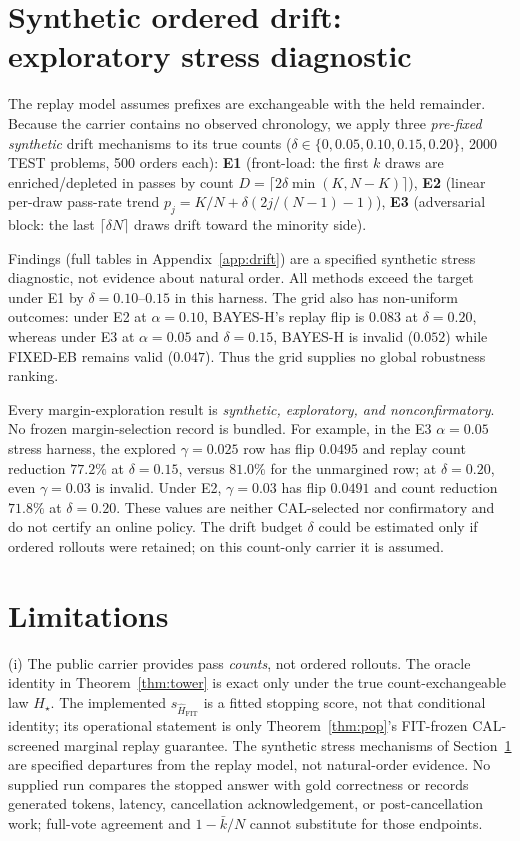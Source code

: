 \documentclass{article}
\theoremstyle{definition}
\theoremstyle{remark}
\newcommand{\trueH}{H_\star}
\newcommand{\fitscore}{s_{\widehat H_{\mathrm{FIT}}}}
\begin{document}
\section{Synthetic ordered drift: exploratory stress diagnostic}
\label{sec:drift}

The replay model assumes prefixes are exchangeable with the held remainder.
Because the carrier contains no observed chronology, we apply three
\emph{pre-fixed synthetic} drift mechanisms to its true counts
($\delta\in\{0,0.05,0.10,0.15,0.20\}$, 2000 TEST problems, 500 orders each):
\textbf{E1} (front-load: the first $k$ draws are enriched/depleted in passes
by count $D=\lceil 2\delta\min(K,N{-}K)\rceil$), \textbf{E2} (linear per-draw
pass-rate trend $p_j=K/N+\delta(2j/(N{-}1){-}1)$), \textbf{E3} (adversarial
block: the last $\lceil\delta N\rceil$ draws drift toward the minority side).

Findings (full tables in Appendix~\ref{app:drift}) are a specified synthetic
stress diagnostic, not evidence about natural order. All methods exceed the
target under E1 by $\delta=0.10$--$0.15$ in this harness. The grid also has
non-uniform outcomes: under E2 at $\alpha=0.10$, BAYES-H's replay flip is
$0.083$ at $\delta=0.20$, whereas under E3 at $\alpha=0.05$ and
$\delta=0.15$, BAYES-H is invalid ($0.052$) while FIXED-EB remains valid
($0.047$). Thus the grid supplies no global robustness ranking.

Every margin-exploration result is \emph{synthetic, exploratory, and
nonconfirmatory}. No frozen margin-selection record is bundled. For example,
in the E3 $\alpha=0.05$ stress harness, the explored $\gamma=0.025$ row has
flip $0.0495$ and replay count reduction $77.2\%$ at $\delta=0.15$, versus
$81.0\%$ for the unmargined row; at $\delta=0.20$, even $\gamma=0.03$ is
invalid. Under E2, $\gamma=0.03$ has flip $0.0491$ and count reduction
$71.8\%$ at $\delta=0.20$. These values are neither CAL-selected nor
confirmatory and do not certify an online policy. The drift budget $\delta$
could be estimated only if ordered rollouts were retained; on this count-only
carrier it is assumed.

\section{Limitations}
\label{sec:limits}
(i) The public carrier provides pass \emph{counts}, not ordered rollouts.
The oracle identity in Theorem~\ref{thm:tower} is exact only under the true
count-exchangeable law $\trueH$. The implemented $\fitscore$ is a fitted
stopping score, not that conditional identity; its operational statement is
only Theorem~\ref{thm:pop}'s FIT-frozen CAL-screened marginal replay guarantee.
The synthetic stress mechanisms of Section~\ref{sec:drift} are specified
departures from the replay model, not natural-order evidence. No supplied run
compares the stopped answer with gold correctness or records generated tokens,
latency, cancellation acknowledgement, or post-cancellation work; full-vote
agreement and $1-\bar k/N$ cannot substitute for those endpoints.
\end{document}
